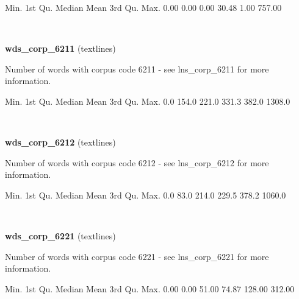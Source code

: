 \documentclass[]{article}
\newenvironment{Shaded}{\begin{snugshade}}{\end{snugshade}}
\newcommand{\FloatTok}[1]{\textcolor[rgb]{0.00,0.00,0.81}{{#1}}}
\newcommand{\NormalTok}[1]{{#1}}
\begin{document}
\begin{Shaded}
\begin{Highlighting}[]
   \NormalTok{Min. 1st Qu.  Median    Mean 3rd Qu.    Max. }
   \FloatTok{0.00}    \FloatTok{0.00}    \FloatTok{0.00}   \FloatTok{30.48}    \FloatTok{1.00}  \FloatTok{757.00} 
\end{Highlighting}
\end{Shaded}

~

\vspace{1em}

\textbf{wds\_corp\_6211} (textlines)

Number of words with corpus code 6211 - see lns\_corp\_6211 for more
information.

\begin{Shaded}
\begin{Highlighting}[]
   \NormalTok{Min. 1st Qu.  Median    Mean 3rd Qu.    Max. }
    \FloatTok{0.0}   \FloatTok{154.0}   \FloatTok{221.0}   \FloatTok{331.3}   \FloatTok{382.0}  \FloatTok{1308.0} 
\end{Highlighting}
\end{Shaded}

~

\vspace{1em}

\textbf{wds\_corp\_6212} (textlines)

Number of words with corpus code 6212 - see lns\_corp\_6212 for more
information.

\begin{Shaded}
\begin{Highlighting}[]
   \NormalTok{Min. 1st Qu.  Median    Mean 3rd Qu.    Max. }
    \FloatTok{0.0}    \FloatTok{83.0}   \FloatTok{214.0}   \FloatTok{229.5}   \FloatTok{378.2}  \FloatTok{1060.0} 
\end{Highlighting}
\end{Shaded}

~

\vspace{1em}

\textbf{wds\_corp\_6221} (textlines)

Number of words with corpus code 6221 - see lns\_corp\_6221 for more
information.

\begin{Shaded}
\begin{Highlighting}[]
   \NormalTok{Min. 1st Qu.  Median    Mean 3rd Qu.    Max. }
   \FloatTok{0.00}    \FloatTok{0.00}   \FloatTok{51.00}   \FloatTok{74.87}  \FloatTok{128.00}  \FloatTok{312.00} 
\end{Highlighting}
\end{Shaded}
\end{document}
